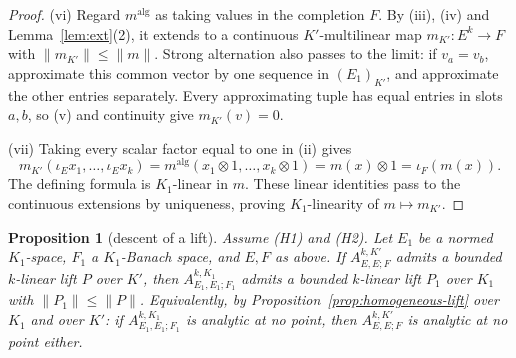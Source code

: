 \documentclass[11pt]{amsart}
\newtheorem{proposition}[theorem]{Proposition}
\theoremstyle{definition}
\theoremstyle{remark}
\numberwithin{equation}{section}
\newcommand{\norm}[1]{\lVert #1\rVert}
\begin{document}
\begin{proof}
\textup{(vi)} Regard $m^{\mathrm{alg}}$ as taking values in the completion $F$.
By \textup{(iii)}, \textup{(iv)} and Lemma~\ref{lem:ext}(2), it extends to a continuous
$K'$\nobreakdash-multilinear map $m_{K'}\colon E^k\to F$ with $\norm{m_{K'}}\le\norm m$.
Strong alternation also passes to the limit: if $v_a=v_b$, approximate this common vector by one sequence in
$(E_1)_{K'}$, and approximate the other entries separately. Every approximating tuple has equal entries in
slots $a,b$, so \textup{(v)} and continuity give $m_{K'}(v)=0$.

\textup{(vii)} Taking every scalar factor equal to one in \textup{(ii)} gives
\[
m_{K'}(\iota_Ex_1,\dots,\iota_Ex_k)
=m^{\mathrm{alg}}(x_1\otimes1,\dots,x_k\otimes1)
=m(x)\otimes1=\iota_F(m(x)).
\]
The defining formula is $K_1$\nobreakdash-linear in $m$. These linear identities pass to the continuous
extensions by uniqueness, proving $K_1$\nobreakdash-linearity of $m\mapsto m_{K'}$.
\end{proof}

\begin{proposition}[descent of a lift]\label{prop:ascent}
Assume \textup{(H1)} and \textup{(H2)}. Let $E_1$ be a normed $K_1$\nobreakdash-space, $F_1$ a $K_1$\nobreakdash-Banach space, and $E,F$ as
above. If $A^{k,K'}_{E,E;F}$ admits a bounded $k$\nobreakdash-linear lift $P$ over $K'$, then $A^{k,K_1}_{E_1,E_1;F_1}$ admits a
bounded $k$\nobreakdash-linear lift $P_1$ over $K_1$ with $\norm{P_1}\le\norm P$. Equivalently, by Proposition~\ref{prop:homogeneous-lift} over $K_1$ and over
$K'$: if $A^{k,K_1}_{E_1,E_1;F_1}$ is analytic at no point, then $A^{k,K'}_{E,E;F}$ is analytic at no point either.
\end{proposition}
\end{document}
